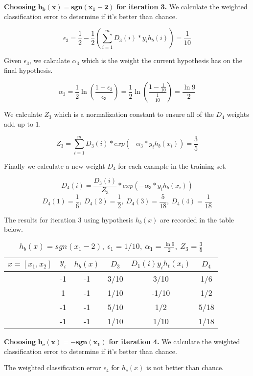 \documentclass[11pt]{article}
\begin{document}
\textbf{Choosing} $\mathbf{h_b(x) = sgn(x_1 - 2)}$ \textbf{for iteration 3.} We calculate the weighted classification error to determine if it's better than chance.

$$\epsilon_3 = \frac{1}{2} - \frac{1}{2}(\sum_{i=1}^m D_3(i)*y_ih_b(i)) = \frac{1}{10}$$

Given $\epsilon_3$, we calculate $\alpha_3$ which is the weight the current hypothesis has on the final hypothesis.

$$\alpha_3 = \frac{1}{2}\ln(\frac{1 - \epsilon_3}{\epsilon_3}) = \frac{1}{2}\ln(\frac{1 - \frac{1}{10}}{\frac{1}{10}}) = \frac{\ln9}{2}$$

We calculate $Z_3$ which is a normalization constant to ensure all of the $D_4$ weights add up to 1.

$$Z_3 = \sum_{i = 1}^m D_3(i) * exp(-\alpha_3 * y_ih_b(x_i)) = \frac{3}{5}$$

Finally we calculate a new weight $D_4$ for each example in the training set.

$$D_{4}(i) = \frac{D_3(i)}{Z_3} * exp(-\alpha_3 * y_ih_b(x_i))$$
$$D_4(1) = \frac{1}{6}, \ D_4(2) = \frac{1}{2}, \ D_4(3) = \frac{5}{18}, \ D_4(4) = \frac{1}{18} $$

The results for iteration 3 using hypothesis $h_b(x)$ are recorded in the table below.

\begin{table}[H]
\centering
{\renewcommand{\arraystretch}{1.2}%
\begin{tabular}{| c | c | c | c | c | c |}
\hline
$x = [x_1, x_2]$& $y_i$ & $h_b(x)$ & $D_3$ & $D_1(i)y_ih_t(x_i)$ & $D_4$\\
\hline
[1,1] & -1 & -1&  3/10&  3/10& 1/6\\ \hline
[1,-1] & 1 &  -1&  1/10&  -1/10& 1/2\\ \hline
[-1,-1] & -1 & -1 & 5/10&  1/2& 5/18\\ \hline
[-1,1] & -1 &  -1&  1/10&  1/10& 1/18\\ \hline
\end{tabular}}
\caption{$h_b(x) = sgn(x_1 - 2), \ \epsilon_1 = 1/10, \ \alpha_1 = \frac{\ln9}{2}, \ Z_3 = \frac{3}{5}$}
\end{table}

\textbf{Choosing} $\mathbf{h_c(x) = -sgn(x_1)}$ \textbf{for iteration 4.} We calculate the weighted classification error to determine if it's better than chance.

The weighted classification error $\epsilon_4$ for $h_c(x)$ is not better than chance.
\end{document}
